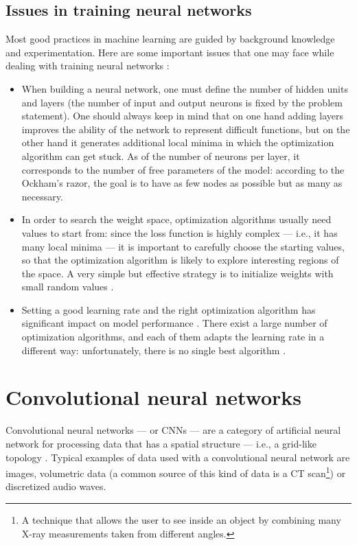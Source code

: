         \subsection{Issues in training neural networks}
            Most good practices in machine learning are guided by background knowledge and experimentation. Here are some important issues that one may face while dealing with training neural networks \cite[397--401]{Hastie}:
            \begin{itemize}
                \item When building a neural network, one must define the number of hidden units and layers (the number of input and output neurons is fixed by the problem statement). One should always keep in mind that on one hand adding layers improves the ability of the network to represent difficult functions, but on the other hand it generates additional local minima in which the optimization algorithm can get stuck. As of the number of neurons per layer, it corresponds to the number of free parameters of the model: according to the Ockham's razor, the goal is to have as few nodes as possible but as many as necessary.
                \item In order to search the weight space, optimization algorithms usually need values to start from: since the loss function is highly complex --- i.e., it has many local minima --- it is important to carefully choose the starting values, so that the optimization algorithm is likely to explore interesting regions of the space. A very simple but effective strategy is to initialize weights with small random values \cite[302]{Goodfellow}.
                \item Setting a good learning rate and the right optimization algorithm has significant impact on model performance \cite[306--310]{Goodfellow}. There exist a large number of optimization algorithms, and each of them adapts the learning rate in a different way: unfortunately, there is no single best algorithm \cite{Schaul}.
            \end{itemize}
    \section{Convolutional neural networks}
        Convolutional neural networks --- or CNNs --- are a category of artificial neural network for processing data that has a spatial structure --- i.e., a grid-like topology \cite[330]{Goodfellow}\cite{LeCunDeepLearning}. Typical examples of data used with a convolutional neural network are images, volumetric data (a common source of this kind of data is a CT scan\footnote{A technique that allows the user to see inside an object by combining many X-ray measurements taken from different angles.}) or discretized audio waves.
        
